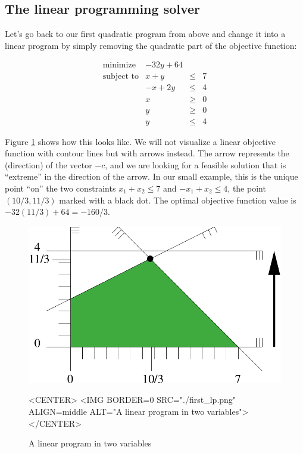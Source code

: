 \subsection{The linear programming solver}
Let's go back to our first quadratic program from above and change it 
into a linear program by simply removing the quadratic part of the
objective function:

\[
\begin{array}{lrcl}
\mbox{minimize}       & - 32y + 64 \\
\mbox{subject to}     & x + y &\leq& 7 \\
                      & -x + 2y &\leq& 4 \\
                      & x &\geq& 0 \\
                      & y &\geq& 0 \\
                      & y &\leq& 4
\end{array}
\] 

Figure \ref{fig:QP-first_lp} shows how this looks like. We will not
visualize a linear objective function with contour lines but with
arrows instead. The arrow represents the (direction) of the vector $-c$,
and we are looking for a feasible solution that is ``extreme'' in the direction
of the arrow. In our small example, this is the unique point ``on'' the
two constraints $x_1+x_2\leq 7$ and $-x_1+x_2\leq 4$, the point
$(10/3,11/3)$ marked with a black dot. The optimal objective function
value is $-32(11/3)+64=-160/3$.

\begin{figure}[htbp]
\begin{ccTexOnly}
\begin{center}
\includegraphics{QP_solver/first_lp} %
\end{center}
\end{ccTexOnly}

\begin{ccHtmlOnly}
<CENTER>
<IMG BORDER=0 SRC="./first_lp.png" ALIGN=middle ALT="A linear program in two variables">
</CENTER>
\end{ccHtmlOnly}

\caption{A linear program in two variables
\label{fig:QP-first_lp}}
\end{figure}

